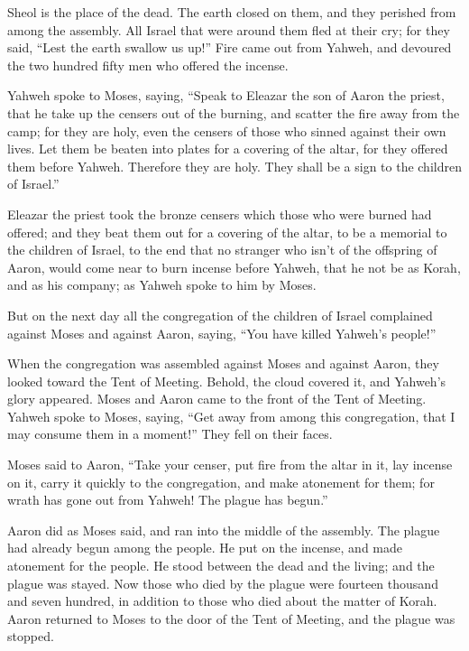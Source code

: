 {{Sheol is the place of the dead.} The earth closed on them, and they perished from among the assembly.
All Israel that were around them fled at their cry; for they said, “Lest the earth swallow us up!”
Fire came out from Yahweh, and devoured the two hundred fifty men who offered the incense.
\par }{\PP {}Yahweh spoke to Moses, saying,
“Speak to Eleazar the son of Aaron the priest, that he take up the censers out of the burning, and scatter the fire away from the camp; for they are holy,
even the censers of those who sinned against their own lives. Let them be beaten into plates for a covering of the altar, for they offered them before Yahweh. Therefore they are holy. They shall be a sign to the children of Israel.”
\par }{\PP {}Eleazar the priest took the bronze censers which those who were burned had offered; and they beat them out for a covering of the altar,
to be a memorial to the children of Israel, to the end that no stranger who isn’t of the offspring of Aaron, would come near to burn incense before Yahweh, that he not be as Korah, and as his company; as Yahweh spoke to him by Moses.
\par }{\PP {}But on the next day all the congregation of the children of Israel complained against Moses and against Aaron, saying, “You have killed Yahweh’s people!”
\par }{\PP {}When the congregation was assembled against Moses and against Aaron, they looked toward the Tent of Meeting. Behold, the cloud covered it, and Yahweh’s glory appeared.
Moses and Aaron came to the front of the Tent of Meeting.
Yahweh spoke to Moses, saying,
“Get away from among this congregation, that I may consume them in a moment!” They fell on their faces.
\par }{\PP {}Moses said to Aaron, “Take your censer, put fire from the altar in it, lay incense on it, carry it quickly to the congregation, and make atonement for them; for wrath has gone out from Yahweh! The plague has begun.”
\par }{\PP {}Aaron did as Moses said, and ran into the middle of the assembly. The plague had already begun among the people. He put on the incense, and made atonement for the people.
He stood between the dead and the living; and the plague was stayed.
Now those who died by the plague were fourteen thousand and seven hundred, in addition to those who died about the matter of Korah.
Aaron returned to Moses to the door of the Tent of Meeting, and the plague was stopped.

}
